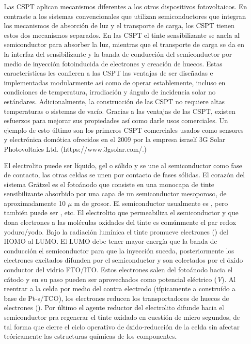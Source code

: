 Las CSPT aplican mecanismos diferentes a los otros dispositivos fotovoltaicos. En contraste a los sistemas convencionales que utilizan semiconductores que integran los mecanismos de absorción de luz y el transporte de carga, los CSPT tienen estos dos mecanismos separados. En las CSPT el tinte sensibilizante se ancla al semiconductor para absorber la luz, mientras que el transporte de carga se da en la interfaz del sensibilizante y la banda de conducción del semiconductor por medio de inyección fotoinducida de electrones y creación de huecos. Estas características les confieren a las CSPT las ventajas de ser diseñadas e implementadas modularmente \cite{hashmi2011review} así como de operar establemente, incluso en condiciones de temperatura, irradiación y ángulo de incidencia solar no estándares. Adicionalmente, la construcción de las CSPT no requiere altas temperaturas o sistemas de vacío. Gracias a las ventajas de las CSPT, existen esfuerzos para mejorar sus propiedades así como darle usos comerciales. Un ejemplo de esto último son los primeros CSPT comerciales usados como sensores y electrónica domótica ofrecidos en el 2009 por la empresa israelí 3G Solar Photovoltaics Ltd. (https://www.3gsolar.com/.)


El electrolito puede ser líquido, gel o sólido y se une al semiconductor como fase de contacto, las otras celdas se unen por contacto de fases sólidas. 
El corazón del sistema Grätzel es el fotoánodo que consiste en una monocapa de tinte sensibilizante absorbido por una capa de un semiconductor mesoporoso, de aproximadamente 10 $\mu$ m de grosor. El semiconductor usualmente es , pero también puede ser , etc. El electrolito que permeabiliza el semiconductor y que dona electrones a las moléculas oxidades del tinte es comúnmente el par redox yoduro/yodo.
Bajo la radiación lumínica el tinte promueve electrones () del HOMO al LUMO. El LUMO debe tener mayor energía que la banda de conducción el semiconductor para que la inyección suceda, posteriormente los electrones excitados difunden por el semiconductor y son colectados por el óxido conductor del vidrio FTO/ITO. Estos electrones salen del fotoánodo hacia el cátodo y en su paso pueden ser aprovechados como potencial eléctrico (\textit{V}). Al reentrar a la celda por medio del contra electrodo (típicamente a construído a base de Pt-s/TCO), los electrones reducen los transportadores de huecos de electrones (). Por último el agente reductor del electrolito difunde hacia el semiconductor pra regenerar el tinte oxidado en cuestión de micro segundos, de tal forma que cierre el ciclo operativo de óxido-reducción de la celda sin afectar teóricamente las estructuras químicas de los componentes.


